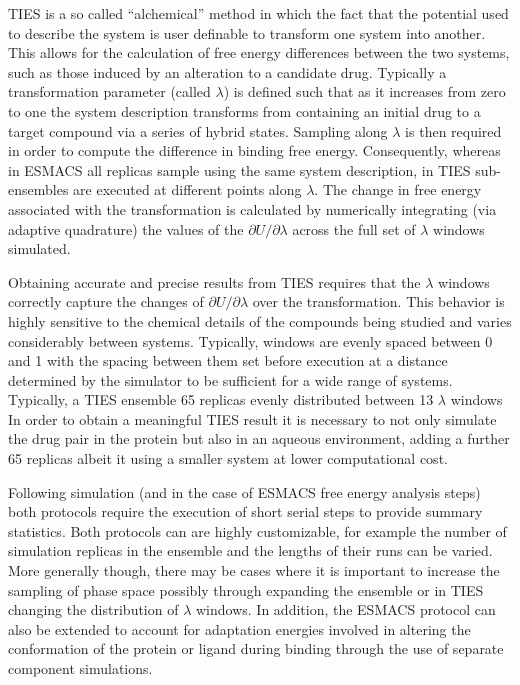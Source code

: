 



TIES is a so called ``alchemical'' method in which the fact that the potential 
used to describe the system is user definable to transform one system into 
another. This allows for the calculation of free energy differences between 
the two systems, such as those induced by an alteration to a candidate drug.
Typically a transformation parameter (called $\lambda$) is defined such 
that as it increases from zero to one the system description transforms from 
containing an initial drug to a target compound via a series of hybrid states.
Sampling along $\lambda$ is then required in order to compute the difference 
in binding free energy. Consequently, whereas in ESMACS all replicas sample 
using the same system description, in TIES sub-ensembles are executed at 
different points along $\lambda$. The change in free energy associated 
with the transformation is calculated by numerically integrating 
(via adaptive quadrature) the values of the $\partial U/\partial\lambda$ 
across the full set of $\lambda$ windows simulated. 

Obtaining accurate and precise results from TIES requires that the $\lambda$ 
windows correctly capture the changes of $\partial U/\partial\lambda$ over 
the transformation. This behavior is highly sensitive to
the chemical details of the compounds being studied and varies considerably 
between systems. Typically, windows are evenly spaced between 0 and 1 with 
the spacing between them set before execution at a distance determined by the 
simulator to be sufficient for a wide range of systems. Typically, a TIES 
ensemble 65 replicas evenly distributed between 13 $\lambda$ windows
In order to obtain a meaningful TIES result it is necessary to not only 
simulate the drug pair in the protein but also in an aqueous environment, 
adding a further 65 replicas albeit it using a smaller system at lower 
computational cost.


Following simulation (and in the case of ESMACS free energy analysis steps) 
both protocols require the execution of short serial steps to provide summary 
statistics. Both protocols can are highly customizable, for example the number 
of simulation replicas in the ensemble and the lengths of their runs can be 
varied. More generally though, there may be cases where it is important to 
increase the sampling of phase space possibly through expanding the ensemble 
or in TIES changing the distribution of $\lambda$ windows.
In addition, the ESMACS protocol can also be extended to account for 
adaptation energies involved in altering the conformation of the protein 
or ligand during binding through the use of separate component simulations.


